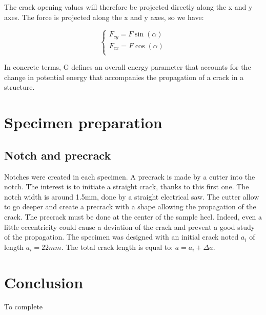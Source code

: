 The crack opening values will therefore be projected directly along the x and y axes. The force is projected along the x and y axes, so we have:


\begin{equation}
	\begin{cases}
		F_{cy}=F \sin(\alpha) \\
		F_{cx}=F \cos(\alpha) \\ 
	\end{cases}
\end{equation}

In concrete terms, G defines an overall energy parameter that accounts for the change in potential energy that accompanies the propagation of a crack in a structure.

\section{Specimen preparation}

\subsection{Notch and precrack}

Notches were created in each specimen. A precrack is made by a cutter into the notch. The interest is to initiate a straight crack, thanks to this first one. The notch width is around 1.5mm, done by a straight electrical saw. The cutter allow to go deeper and create a precrack with a shape allowing the propagation of the crack. The precrack must be done at the center of the sample heel. Indeed, even a little eccentricity could cause a deviation of the crack and prevent a good study of the propagation. The specimen was designed with an initial crack noted $a_i$ of length  $a_i=22mm$. The total crack length is equal to: $a=a_i+\Delta a$.


\section{Conclusion}

To complete


